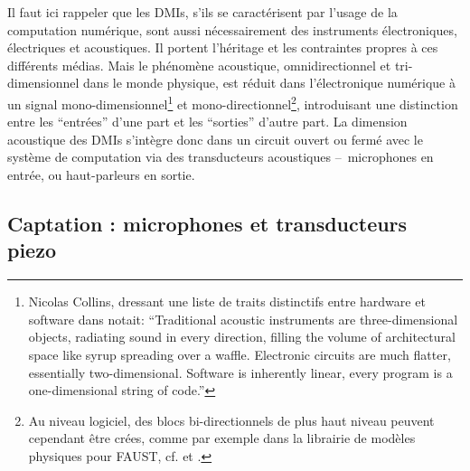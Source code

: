 \noindent Il faut ici rappeler que les \glspl{DMI}, s'ils se caractérisent par l'usage de la computation numérique, sont aussi nécessairement des instruments électroniques, électriques et acoustiques. Il portent l'héritage et les contraintes propres à ces différents médias. Mais le phénomène acoustique, omnidirectionnel et tri-dimensionnel dans le monde physique, est réduit dans l'électronique numérique à un signal mono-dimensionnel\footnote{Nicolas Collins, dressant une liste de traits distinctifs entre hardware et software dans \cite{collins_semiconducting_2013} notait: ``Traditional acoustic instruments are three-dimensional objects, radiating sound in every direction, filling the volume of architectural space like syrup spreading over a waffle. Electronic circuits are much flatter, essentially two-dimensional. Software is inherently linear, every program is a one-dimensional string of code.''} et mono-directionnel\footnote{Au niveau logiciel, des blocs bi-directionnels de plus haut niveau peuvent cependant être crées, comme par exemple dans la librairie de modèles physiques pour \gls{FAUST}, cf. \cite{berdahl_introduction_2012} et \cite{michon_faust_2018}.}, introduisant une distinction entre les ``entrées'' d'une part et les ``sorties'' d'autre part. La dimension acoustique des \glspl{DMI} s'intègre donc dans un circuit ouvert ou fermé avec le système de computation via des transducteurs acoustiques --~microphones en entrée, ou haut-parleurs en sortie.\\

\subsection{Captation : microphones et transducteurs piezo}

